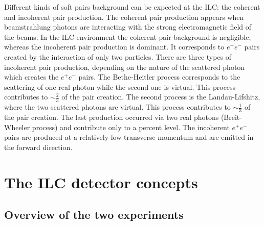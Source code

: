     Different kinds of soft pairs background can be expected at the \gls{ILC}: the coherent and incoherent pair production.
    The coherent pair production appears when beamstrahlung photons are interacting with the strong electromagnetic field of the beams.
    In the \gls{ILC} environment the coherent pair background is negligible, whereas the incoherent pair production is dominant.
    It corresponds to $e^+e^-$ pairs created by the interaction of only two particles.
    There are three types of incoherent pair production, depending on the nature of the scattered photon which creates the $e^{+}e^{-}$ pairs.
    The Bethe-Heitler process corresponds to the scattering of one real photon while the second one is virtual.
    This process contributes to $\sim \frac{2}{3}$ of the pair creation.
    The second process is the Landau-Lifshitz, where the two scattered photons are virtual.
    This process contributes to $\sim \frac{1}{3}$ of the pair creation.
    The last production occurred via two real photons (Breit-Wheeler process) and contribute only to a percent level.
    The incoherent $e^+e^-$ pairs are produced at a relatively low transverse momentum and are emitted in the forward direction.
    
  \section{The ILC detector concepts}
  \label{sec:detectors}

    \subsection{Overview of the two experiments}
    
